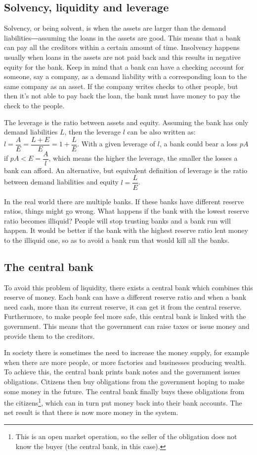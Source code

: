 \subsection{Solvency, liquidity and leverage}
Solvency, or being solvent, is when the assets are larger than the demand liabilities―assuming the loans in the assets are good. This means that a bank can pay all the creditors within a certain amount of time. Insolvency happens usually when loans in the assets are not paid back and this results in negative equity for the bank. Keep in mind that a bank can have a checking account for someone, say a company, as a demand liability with a corresponding loan to the same company as an asset. If the company writes checks to other people, but then it's not able to pay back the loan, the bank must have money to pay the check to the people.

The leverage is the ratio between assets and equity. Assuming the bank has only demand liabilities $L$, then the leverage $l$ can be also written as: $l = \dfrac{A}{E} = \dfrac{L+E}{E} = 1 + \dfrac{L}{E}$. With a given leverage of $l$, a bank could bear a loss $pA$ if $pA < E = \dfrac{A}{l}$, which means the higher the leverage, the smaller the losses a bank can afford.
An alternative, but equivalent definition of leverage is the ratio between demand liabilities and equity $l = \dfrac{L}{E}$. 

In the real world there are multiple banks. If these banks have different reserve ratios, things might go wrong. What happens if the bank with the lowest reserve ratio becomes illiquid? People will stop trusting banks and a bank run will happen. It would be better if the bank with the highest reserve ratio lent money to the illiquid one, so as to avoid a bank run that would kill all the banks. 

\subsection{The central bank}
To avoid this problem of liquidity, there exists a central bank which combines this reserve of money. Each bank can have a different reserve ratio and when a bank need cash, more than its current reserve, it can get it from the central reserve. Furthermore, to make people feel more safe, this central bank is linked with the government. This means that the government can raise taxes or issue money and provide them to the creditors. 

In society there is sometimes the need to increase the money supply, for example when there are more people, or more factories and businesses producing wealth. To achieve this, the central bank prints bank notes and the government issues obligations. Citizens then buy obligations from the government hoping to make some money in the future. The central bank finally buys these obligations from the citizens\footnote{This is an open market operation, so the seller of the obligation does not know the buyer (the central bank, in this case).}, which can in turn put money back into their bank accounts. The net result is that there is now more money in the system.

